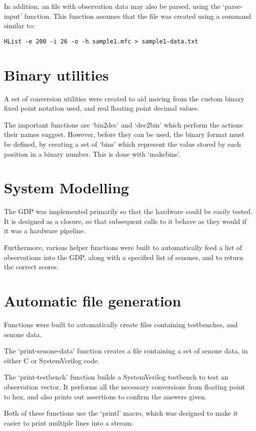 	In addition, an file with observation data may also be parsed, using the `parse-input' function.  This function assumes that the file was created using a command similar to: 

	\texttt{HList -e 200 -i 26 -o -h sample1.mfc > sample1-data.txt}


\section{Binary utilities} %
\label{apdx:binary_utilities}
	A set of conversion utilities were created to aid moving from the custom binary fixed point notation used, and real floating point decimal values.

	The important functions are `bin2dec' and `dec2bin' which perform the actions their names suggest.  However, before they can be used, the binary format must be defined, by creating a set of `bins' which represent the value stored by each position in a binary number.  This is done with `makebins'.


\section{System Modelling} %
\label{apdx:system_modelling}
	The GDP was implemented primarily so that the hardware could be easily tested.  It is designed as a closure, so that subsequent calls to it behave as they would if it was a hardware pipeline.

	Furthermore, various helper functions were built to automatically feed a list of observations into the GDP, along with a specified list of senones, and to return the correct scores.


\section{Automatic file generation} %
\label{apdx:testbenches}
	Functions were built to automatically create files containing testbenches, and senone data.  

	The `print-senone-data' function creates a file containing a set of senone data, in either C or SystemVerilog code.

	The `print-testbench' function builds a SystemVerilog testbench to test an observation vector.  It performs all the necessary conversions from floating point to hex, and also prints out assertions to confirm the answers given.

	Both of these functions use the `printl' macro, which was designed to make it easier to print multiple lines into a stream.

